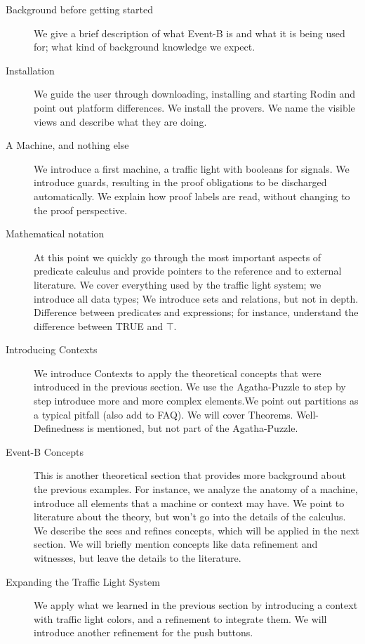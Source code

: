 \begin{description}
	\item[Background before getting started] We give a brief description of what Event-B is and what it is being used for; what kind of background knowledge we expect.
	\item[Installation] We guide the user through downloading, installing and starting Rodin and point out platform differences.  We install the provers.  We name the visible views and describe what they are doing.
	\item[A Machine, and nothing else] We introduce a first machine, a traffic light with booleans for signals. 
      We introduce guards, resulting in the proof obligations to be discharged automatically.
      We explain how proof labels are read, without changing to the proof perspective.
	\item[Mathematical notation] At this point we quickly go through the most important aspects of predicate calculus and provide pointers to the reference and to external literature.  We cover everything used by the traffic light system; we introduce all data types; We introduce sets and relations, but not in depth.  Difference between predicates and expressions; for instance, understand the difference between TRUE and $\top$.  
	\item[Introducing Contexts] We introduce Contexts to apply the theoretical concepts that were introduced in the previous section.  We use the Agatha-Puzzle to step by step introduce more and more complex elements.We point out partitions as a typical pitfall (also add to FAQ).  We will cover Theorems. Well-Definedness is mentioned, but not part of the Agatha-Puzzle.
	\item[Event-B Concepts] This is another theoretical section that provides more background about the previous examples.  For instance, we analyze the anatomy of a machine, introduce all elements that a machine or context may have. We point to literature about the theory, but won't go into the details of the  calculus.  We describe the sees and refines concepts, which will be applied in the next section.  We will briefly mention concepts like data refinement and witnesses, but leave the details to the literature.

	\item[Expanding the Traffic Light System]  We apply what we learned in the previous section by introducing a context with traffic light colors, and a refinement to integrate them.  We will introduce another refinement for the push buttons.


\end{description}
